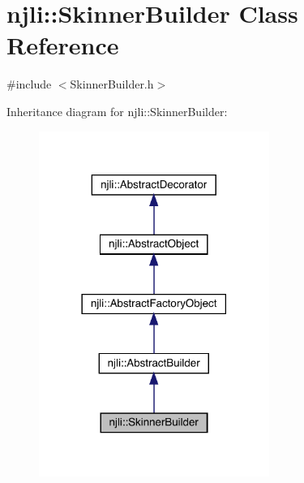 \hypertarget{classnjli_1_1_skinner_builder}{}\section{njli\+:\+:Skinner\+Builder Class Reference}
\label{classnjli_1_1_skinner_builder}


{\ttfamily \#include $<$Skinner\+Builder.\+h$>$}



Inheritance diagram for njli\+:\+:Skinner\+Builder\+:\nopagebreak
\begin{figure}[H]
\begin{center}
\leavevmode
\includegraphics[width=213pt]{classnjli_1_1_skinner_builder__inherit__graph}
\end{center}
\end{figure}


